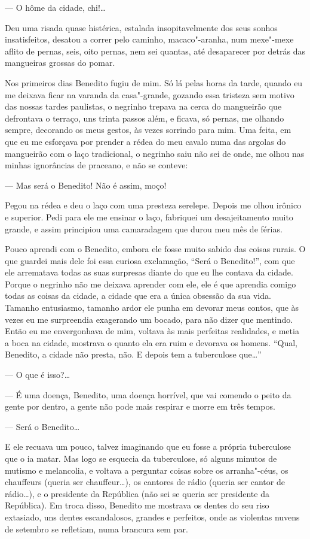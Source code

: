 --- O hôme da cidade, chi!\ldots{}

Deu uma risada quase histérica, estalada insopitavelmente dos seus
sonhos insatisfeitos, desatou a correr pelo caminho, macaco"-aranha, num
mexe"-mexe aflito de pernas, seis, oito pernas, nem sei quantas, até
desaparecer por detrás das mangueiras grossas do pomar.

Nos primeiros dias Benedito fugiu de mim. Só lá pelas horas da tarde,
quando eu me deixava ficar na varanda da casa"-grande, gozando essa
tristeza sem motivo das nossas tardes paulistas, o negrinho trepava na
cerca do mangueirão que defrontava o terraço, uns trinta passos além, e
ficava, só pernas, me olhando sempre, decorando os meus gestos, às vezes
sorrindo para mim. Uma feita, em que eu me esforçava por prender a rédea
do meu cavalo numa das argolas do mangueirão com o laço tradicional, o
negrinho saiu não sei de onde, me olhou nas minhas ignorâncias de
praceano, e não se conteve:

--- Mas será o Benedito! Não é assim, moço!

Pegou na rédea e deu o laço com uma presteza serelepe. Depois me olhou
irônico e superior. Pedi para ele me ensinar o laço, fabriquei um
desajeitamento muito grande, e assim principiou uma camaradagem que
durou meu mês de férias.

Pouco aprendi com o Benedito, embora ele fosse muito sabido das coisas
rurais. O que guardei mais dele foi essa curiosa exclamação, ``Será o
Benedito!'', com que ele arrematava todas as suas surpresas diante do
que eu lhe contava da cidade. Porque o negrinho não me deixava aprender
com ele, ele é que aprendia comigo todas as coisas da cidade, a cidade
que era a única obsessão da sua vida. Tamanho entusiasmo, tamanho ardor
ele punha em devorar meus contos, que às vezes eu me surpreendia
exagerando um bocado, para não dizer que mentindo. Então eu me
envergonhava de mim, voltava às mais perfeitas realidades, e metia a
boca na cidade, mostrava o quanto ela era ruim e devorava os homens.
``Qual, Benedito, a cidade não presta, não. E depois tem a tuberculose
que\ldots{}''

--- O que é isso?\ldots{}

--- É uma doença, Benedito, uma doença horrível, que vai comendo o peito
da gente por dentro, a gente não pode mais respirar e morre em três
tempos.

--- Será o Benedito\ldots{}

E ele recuava um pouco, talvez imaginando que eu fosse a própria
tuberculose que o ia matar. Mas logo se esquecia da tuberculose, só
alguns minutos de mutismo e melancolia, e voltava a perguntar coisas
sobre os arranha"-céus, os chauffeurs (queria ser chauffeur\ldots{}), os
cantores de rádio (queria ser cantor de rádio\ldots{}), e o presidente da
República (não sei se queria ser presidente da República). Em troca
disso, Benedito me mostrava os dentes do seu riso extasiado, uns dentes
escandalosos, grandes e perfeitos, onde as violentas nuvens de setembro
se refletiam, numa brancura sem par.

